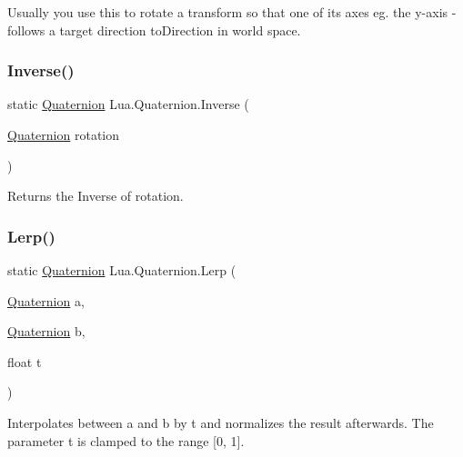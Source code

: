 Usually you use this to rotate a transform so that one of its axes eg. the y-\/axis -\/ follows a target direction to\+Direction in world space. \mbox{\label{class_lua_1_1_quaternion_a324d82496815f927ebcaa21032843276}} 
\subsubsection{\texorpdfstring{Inverse()}{Inverse()}}
{\footnotesize\ttfamily static \mbox{\hyperlink{class_lua_1_1_quaternion}{Quaternion}} Lua.\+Quaternion.\+Inverse (\begin{DoxyParamCaption}\item[{\mbox{\hyperlink{class_lua_1_1_quaternion}{Quaternion}}}]{rotation }\end{DoxyParamCaption})\hspace{0.3cm}{\ttfamily [static]}}



Returns the Inverse of rotation. 

\mbox{\label{class_lua_1_1_quaternion_a451a68530c7d148d83024edf4bb79e26}} 
\subsubsection{\texorpdfstring{Lerp()}{Lerp()}}
{\footnotesize\ttfamily static \mbox{\hyperlink{class_lua_1_1_quaternion}{Quaternion}} Lua.\+Quaternion.\+Lerp (\begin{DoxyParamCaption}\item[{\mbox{\hyperlink{class_lua_1_1_quaternion}{Quaternion}}}]{a,  }\item[{\mbox{\hyperlink{class_lua_1_1_quaternion}{Quaternion}}}]{b,  }\item[{float}]{t }\end{DoxyParamCaption})\hspace{0.3cm}{\ttfamily [static]}}



Interpolates between a and b by t and normalizes the result afterwards. The parameter t is clamped to the range \mbox{[}0, 1\mbox{]}. 

\mbox{\label{class_lua_1_1_quaternion_ad43d2f3aa2d460ed567351f97aba6bfe}} 
